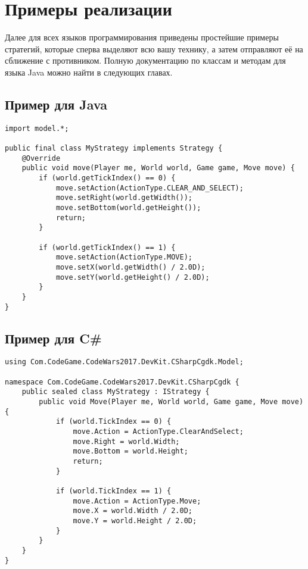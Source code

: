 \newpage
\section{Примеры реализации}

Далее для всех языков программирования приведены простейшие примеры стратегий, которые сперва выделяют всю вашу технику, а затем отправляют
её на сближение с противником. Полную документацию по классам и методам для языка Java можно найти в следующих главах.

\subsection{Пример для Java}

\begin{verbatim}
import model.*;

public final class MyStrategy implements Strategy {
    @Override
    public void move(Player me, World world, Game game, Move move) {
        if (world.getTickIndex() == 0) {
            move.setAction(ActionType.CLEAR_AND_SELECT);
            move.setRight(world.getWidth());
            move.setBottom(world.getHeight());
            return;
        }

        if (world.getTickIndex() == 1) {
            move.setAction(ActionType.MOVE);
            move.setX(world.getWidth() / 2.0D);
            move.setY(world.getHeight() / 2.0D);
        }
    }
}
\end{verbatim}

\subsection{Пример для C\#}

\begin{verbatim}
using Com.CodeGame.CodeWars2017.DevKit.CSharpCgdk.Model;

namespace Com.CodeGame.CodeWars2017.DevKit.CSharpCgdk {
    public sealed class MyStrategy : IStrategy {
        public void Move(Player me, World world, Game game, Move move) {
            if (world.TickIndex == 0) {
                move.Action = ActionType.ClearAndSelect;
                move.Right = world.Width;
                move.Bottom = world.Height;
                return;
            }

            if (world.TickIndex == 1) {
                move.Action = ActionType.Move;
                move.X = world.Width / 2.0D;
                move.Y = world.Height / 2.0D;
            }
        }
    }
}
\end{verbatim}


